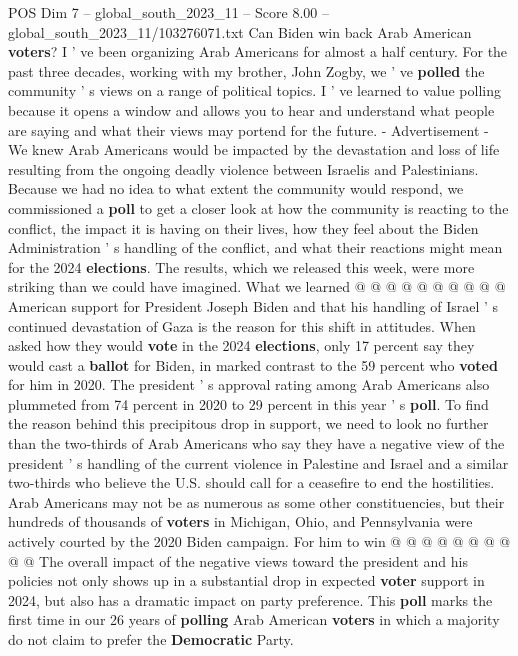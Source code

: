 \begin{textsample}{POS Dim 7 – global\_south\_2023\_11 – Score 8.00 – global\_south\_2023\_11/103276071.txt}  \label{ex:f7_pos_299}
Can Biden win back Arab American \textbf{voters}?
I ' ve been organizing Arab Americans for almost a half century.
For the past three decades, working with my brother, John Zogby, we ' ve \textbf{polled} the community ' s views on a range of political topics.
I ' ve learned to value polling because it opens a window and allows you to hear and understand what people are saying and what their views may portend for the future. - Advertisement - We knew Arab Americans would be impacted by the devastation and loss of life resulting from the ongoing deadly violence between Israelis and Palestinians.
Because we had no idea to what extent the community would respond, we commissioned a \textbf{poll} to get a closer look at how the community is reacting to the conflict, the impact it is having on their lives, how they feel about the Biden Administration ' s handling of the conflict, and what their reactions might mean for the 2024 \textbf{elections}.
The results, which we released this week, were more striking than we could have imagined.
What we learned @ @ @ @ @ @ @ @ @ @ American support for President Joseph Biden and that his handling of Israel ' s continued devastation of Gaza is the reason for this shift in attitudes.
When asked how they would \textbf{vote} in the 2024 \textbf{elections}, only 17 percent say they would cast a \textbf{ballot} for Biden, in marked contrast to the 59 percent who \textbf{voted} for him in 2020.
The president ' s approval rating among Arab Americans also plummeted from 74 percent in 2020 to 29 percent in this year ' s \textbf{poll}.
To find the reason behind this precipitous drop in support, we need to look no further than the two-thirds of Arab Americans who say they have a negative view of the president ' s handling of the current violence in Palestine and Israel and a similar two-thirds who believe the U.S. should call for a ceasefire to end the hostilities.
Arab Americans may not be as numerous as some other constituencies, but their hundreds of thousands of \textbf{voters} in Michigan, Ohio, and Pennsylvania were actively courted by the 2020 Biden campaign.
For him to win @ @ @ @ @ @ @ @ @ @ The overall impact of the negative views toward the president and his policies not only shows up in a substantial drop in expected \textbf{voter} support in 2024, but also has a dramatic impact on party preference.
This \textbf{poll} marks the first time in our 26 years of \textbf{polling} Arab American \textbf{voters} in which a majority do not claim to prefer the \textbf{Democratic} Party.

\end{textsample}
